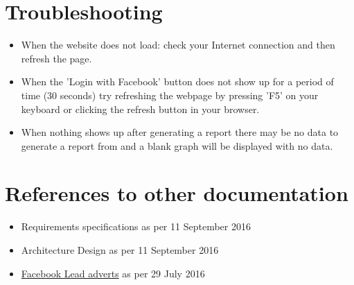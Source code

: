\documentclass{article}
\begin{document}
	\section{Troubleshooting}
		\begin{itemize}
			\item When the website does not load: check your Internet connection and then refresh the page.
			\item When the 'Login with Facebook' button does not show up for a period of time (30 seconds) try refreshing the webpage by pressing 'F5' on your keyboard or clicking the refresh button in your browser.
			\item When nothing shows up after generating a report there may be no data to generate a report from and a blank graph will be displayed with no data.
		\end{itemize}

	\section{References to other documentation}
		\begin{itemize}
			\item{Requirements specifications as per 11 September 2016}
			\item{Architecture Design as per 11 September 2016}
			\item{\href{https://www.facebook.com/business/a/lead-ads}{Facebook Lead adverts} as per 29 July 2016}
		\end{itemize}
\end{document}
